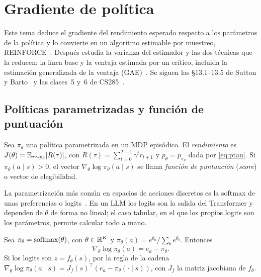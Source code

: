 \chapter{Gradiente de política}
\label{tema:2}

Este tema deduce el gradiente del rendimiento esperado respecto a los parámetros de la política y lo convierte en un algoritmo estimable por muestreo, REINFORCE~\cite{williams}. Después estudia la varianza del estimador y las dos técnicas que la reducen: la línea base y la ventaja estimada por un crítico, incluida la estimación generalizada de la ventaja (GAE)~\cite{gae}. Se siguen las §13.1--13.5 de Sutton y Barto~\cite{sb} y las clases~5 y~6 de CS285~\cite{cs285}.

\section{Políticas parametrizadas y función de puntuación}

\begin{definicion}\label{def:score}
Sea $\pi_\theta$ una política parametrizada en un MDP episódico. El \emph{rendimiento} es $J(\theta)=\mathbb{E}_{\tau\sim p_\theta}[R(\tau)]$, con $R(\tau)=\sum_{t=0}^{T-1}\gamma^{t}r_{t+1}$ y $p_\theta=p_{\pi_\theta}$ dada por \eqref{eq:ptau}. Si $\pi_\theta(a\mid s)>0$, el vector $\nabla_\theta\log\pi_\theta(a\mid s)$ se llama \emph{función de puntuación} (\emph{score}) o vector de elegibilidad.
\end{definicion}

La parametrización más común en espacios de acciones discretos es la softmax de unas preferencias o logits~\cite[§13.1]{sb}. En un LLM los logits son la salida del Transformer y dependen de $\theta$ de forma no lineal; el caso tabular, en el que los propios logits son los parámetros, permite calcular todo a mano.

\begin{proposicion}\label{prop:score-softmax}
Sea $\pi_\theta=\operatorname{softmax}(\theta)$, con $\theta\in\mathbb{R}^{K}$ y $\pi_\theta(a)=e^{\theta_a}/\sum_b e^{\theta_b}$. Entonces
\[
\nabla_\theta\log\pi_\theta(a)=e_a-\pi_\theta .
\]
Si los logits son $z=f_\theta(s)$, por la regla de la cadena $\nabla_\theta\log\pi_\theta(a\mid s)=J_f(s)^{\top}(e_a-\pi_\theta(\cdot\mid s))$, con $J_f$ la matriz jacobiana de $f_\theta$.
\end{proposicion}

